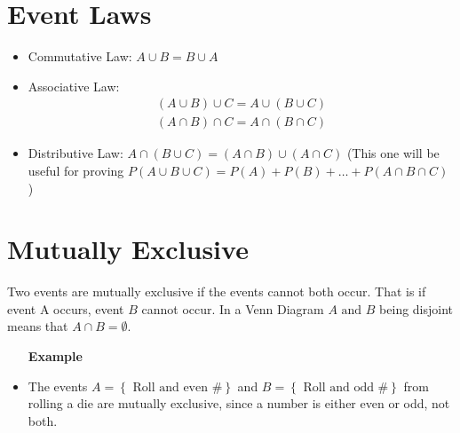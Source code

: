 \documentclass[11pt]{book}
\begin{document}

\section{Event Laws}%
\label{sec:event_laws}

\begin{itemize}
    \item Commutative Law: $A \cup B= B\cup A$ 
    \item Associative Law:
        \begin{gather*}
            \left( A\cup B \right) \cup C = A\cup \left( B\cup C \right) \\
            \left( A \cap B \right) \cap C = A \cap \left( B\cap C \right) 
        \end{gather*}
    \item Distributive Law: $A \cap \left( B\cup C \right) = \left( A\cap B \right) \cup \left( A\cap C \right) $ (This one will be useful for proving $P\left(A\cup B\cup C\right) = P\left(A\right)  + P\left(B\right)  + \ldots  +  P\left(A\cap B\cap C\right) $ )
\end{itemize}


\section{Mutually Exclusive}%
\label{sec:mutually_exclusive}

\begin{defn}\label{defn:mutually_exclusive}
    Two events are mutually exclusive if the events cannot both occur. That is if event A occurs, event $B$ cannot occur. In a Venn Diagram $A \text{ and } B$ being disjoint means that $A\cap B= \emptyset $.
\end{defn}

\begin{itemize}
    \item [\textbf{Example}] 
    \item The events $A= \left\{ \text{ Roll and even \# }  \right\} $ and $B= \left\{ \text{ Roll and odd \# }  \right\} $ from rolling a die are mutually exclusive, since a number is either even or odd, not both.
\end{itemize}

\end{document}
